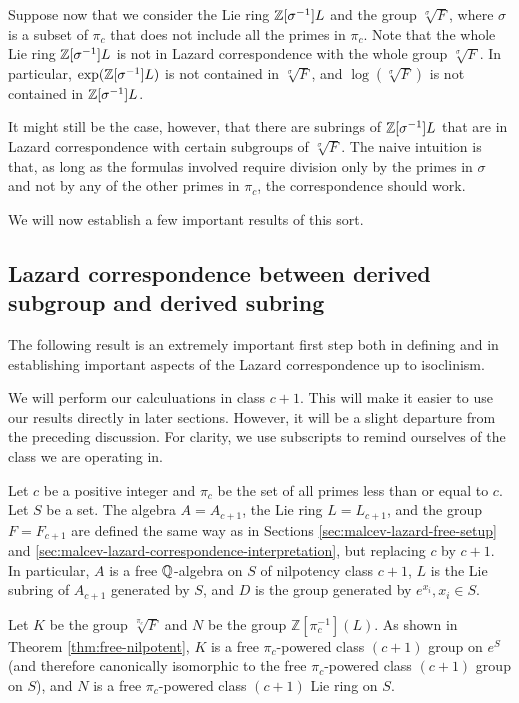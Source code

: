 Suppose now that we consider the Lie ring $\mathbb{Z}[\sigma^{-1}]L$ and the
group $\sqrt[\sigma]{F}$, where $\sigma$ is a subset of $\pi_c$ that
does not include all the primes in $\pi_c$. Note that the whole Lie
ring $\mathbb{Z}[\sigma^{-1}]L$ is not in Lazard correspondence with the whole
group $\sqrt[\sigma]{F}$. In particular, $\exp(\mathbb{Z}[\sigma^{-1}]L)$ is
not contained in $\sqrt[\sigma]{F}$, and $\log(\sqrt[\sigma]{F})$ is
not contained in $\mathbb{Z}[\sigma^{-1}]L$.

It might still be the case, however, that there are subrings of
$\mathbb{Z}[\sigma^{-1}]L$ that are in Lazard correspondence with certain
subgroups of $\sqrt[\sigma]{F}$. The naive intuition is that, as long
as the formulas involved require division only by the primes in
$\sigma$ and not by any of the other primes in $\pi_c$, the
correspondence should work.

We will now establish a few important results of this sort.

\subsection{Lazard correspondence between derived subgroup and derived subring}\label{sec:lazard-correspondence-derived}

The following result is an extremely important first step both in
defining and in establishing important aspects of the Lazard
correspondence up to isoclinism.

We will perform our calculuations in class $c + 1$. This will make it
easier to use our results directly in later sections. However, it will
be a slight departure from the preceding discussion. For clarity, we
use subscripts to remind ourselves of the class we are operating in.

Let $c$ be a positive integer and $\pi_c$ be the set of all primes
less than or equal to $c$. Let $S$ be a set. The algebra $A =
A_{c+1}$, the Lie ring $L = L_{c+1}$, and the group $F = F_{c+1}$ are
defined the same way as in Sections \ref{sec:malcev-lazard-free-setup}
and \ref{sec:malcev-lazard-correspondence-interpretation}, but
replacing $c$ by $c + 1$. In particular, $A$ is a free
$\mathbb{Q}$-algebra on $S$ of nilpotency class $c + 1$, $L$ is the Lie
subring of $A_{c+1}$ generated by $S$, and $D$ is the group
generated by $e^{x_i}, x_i \in S$.

Let $K$ be the group $\sqrt[\pi_c]{F}$ and $N$ be the group
$\mathbb{Z}[\pi_c^{-1}](L)$. As shown in Theorem
\ref{thm:free-nilpotent}, $K$ is a free $\pi_c$-powered class $(c +
1)$ group on $e^S$ (and therefore canonically isomorphic to the free
$\pi_c$-powered class $(c + 1)$ group on $S$), and $N$ is a free
$\pi_c$-powered class $(c + 1)$ Lie ring on $S$.

